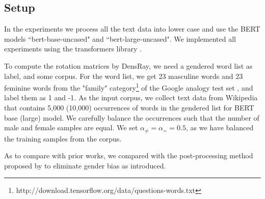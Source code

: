 \subsection{Setup}
In the experiments we process all the text data into lower case and use the BERT models ``bert-base-uncased" and ``bert-large-uncased". We implemented all experiments using the transformers library \citep{wolf2019huggingfaces}.

To compute the rotation matrices by DensRay, we need a gendered word list as label, and some corpus. For the word list, we get 23 masculine words and 23 feminine words from the "family" category\footnote{http://download.tensorflow.org/data/questions-words.txt} of the Google analogy test set \citep{mikolov2013efficient}, and label them as 1 and -1. As the input corpus, we collect text data from Wikipedia that contains 5,000 (10,000) occurrences of words in the gendered list for BERT base (large) model. We carefully balance the occurrences such that the number of male and female samples are equal. We set  $\alpha_{\neq}=\alpha_{=}=0.5$, as we have balanced the training samples from the corpus.

As to compare with prior works, we compared with the post-processing method proposed by \citet{mu2018all} to eliminate gender bias as \citet{karve2019conceptor} introduced. 

